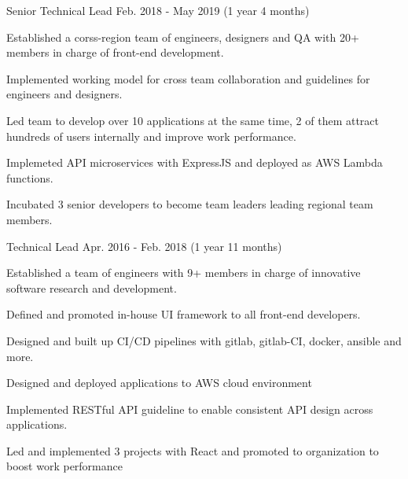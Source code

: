 \begin{cventries}
  \cventry
    {Senior Technical Lead} %
    {} %
    {} %
    {Feb. 2018 - May 2019 (1 year 4 months)} %
    {
      \begin{cvitems} %
        \item {Established a corss-region team of engineers, designers and QA with 20+ members in charge of front-end development.}
        \item {Implemented working model for cross team collaboration and guidelines for engineers and designers.}
        \item {Led team to develop over 10 applications at the same time, 2 of them attract hundreds of users internally and improve work performance.}
        \item {Implemeted API microservices with ExpressJS and deployed as AWS Lambda functions.}
        \item {Incubated 3 senior developers to become team leaders leading regional team members.}
      \end{cvitems}
    }

  \cventry
    {Technical Lead} %
    {} %
    {} %
    {Apr. 2016 - Feb. 2018 (1 year 11 months)} %
    {
      \begin{cvitems} %
        \item {Established a team of engineers with 9+ members in charge of innovative software research and development.}
        \item {Defined and promoted in-house UI framework to all front-end developers.}
        \item {Designed and built up CI/CD pipelines with gitlab, gitlab-CI, docker, ansible and more.}
        \item {Designed and deployed applications to AWS cloud environment}
        \item {Implemented RESTful API guideline to enable consistent API design across applications.}
        \item {Led and implemented 3 projects with React and promoted to organization to boost work performance}
      \end{cvitems}
    }


\end{cventries}
